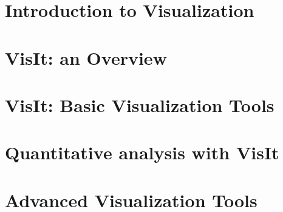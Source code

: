 \documentclass[xcolor=svgnames]{beamer}
\providecommand{\sectionpage}{\Large\centering \bf\mediumblue\insertsection}
\begin{document}
\section{Introduction to Visualization}
\introEnv
\frame{\sectionpage}
  
\resetEnv

\section{VisIt: an Overview}
\basicEnv
\frame{\sectionpage}
 
\resetEnv

\section{VisIt: Basic Visualization Tools}
\basicEnv
\frame{\sectionpage}
 
 
\resetEnv

\section{Quantitative analysis with VisIt}
\normalEnv
\frame{\sectionpage}
 
\resetEnv

\section{Advanced Visualization Tools}
\advEnv
\frame{\sectionpage}
 
\resetEnv

\end{document}
